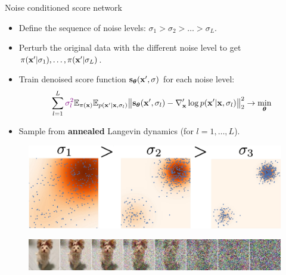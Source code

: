 \begin{frame}{Noise conditioned score network}
	\begin{itemize}
		\item Define the sequence of noise levels: $\sigma_1 > \sigma_2 > \dots > \sigma_L$.
		\item Perturb the original data with the different noise level to get $\pi(\mathbf{x}' | \sigma_1), \dots, \pi(\mathbf{x}' | \sigma_L)$.
		\item Train denoised score function $\mathbf{s}_{\boldsymbol{\theta}}(\mathbf{x}', \sigma)$ for each noise level:
		\vspace{-0.2cm}
		\[
			\sum_{l=1}^L {\color{violet}\sigma_l^2} \mathbb{E}_{\pi(\mathbf{x})} \mathbb{E}_{p(\mathbf{x}' | \mathbf{x}, \sigma_l)}\bigl\| \mathbf{s}_{\boldsymbol{\theta}}(\mathbf{x}', \sigma_l) - \nabla_{\mathbf{x}}' \log p(\mathbf{x}' | \mathbf{x}, \sigma_l) \bigr\|^2_2 \rightarrow \min_{\boldsymbol{\theta}}
		\]
		\item Sample from \textbf{annealed} Langevin dynamics (for $l=1, \dots, L$).
	\end{itemize}
	\begin{figure}
		\includegraphics[width=0.6\linewidth]{figs/multi_scale}
	\end{figure}
	\begin{figure}
		\includegraphics[width=\linewidth]{figs/duoduo}
	\end{figure}
\end{frame}

